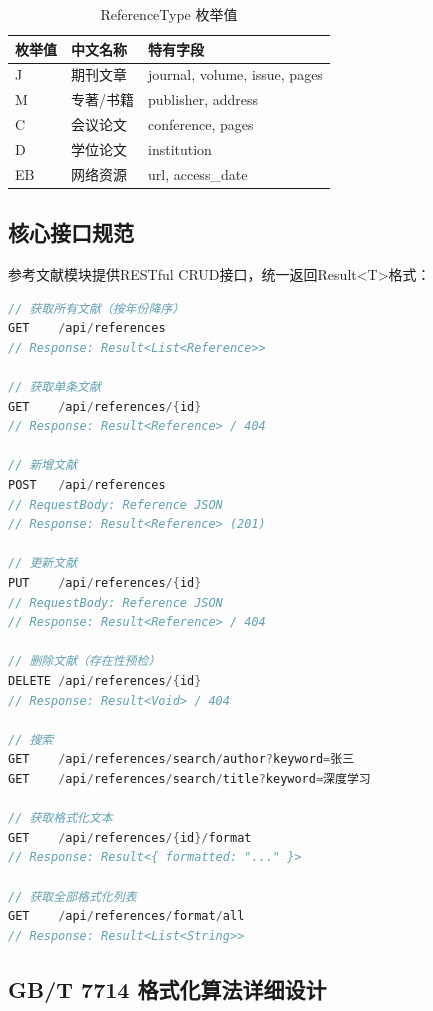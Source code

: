 \documentclass{../softeng}
\begin{document}
\begin{table}[htbp]
\centering
\caption{ReferenceType 枚举值}
\label{tab:reftype}
\begin{tabular}{llp{8cm}}
\toprule
\textbf{枚举值} & \textbf{中文名称} & \textbf{特有字段} \\
\midrule
J  & 期刊文章 & journal, volume, issue, pages \\
M  & 专著/书籍 & publisher, address \\
C  & 会议论文 & conference, pages \\
D  & 学位论文 & institution \\
EB & 网络资源 & url, access\_date \\
\bottomrule
\end{tabular}
\end{table}

\subsection{核心接口规范}

参考文献模块提供RESTful CRUD接口，统一返回Result<T>格式：

\begin{lstlisting}[language=Java,caption={ReferenceController 核心接口}]
// 获取所有文献（按年份降序）
GET    /api/references
// Response: Result<List<Reference>>

// 获取单条文献
GET    /api/references/{id}
// Response: Result<Reference> / 404

// 新增文献
POST   /api/references
// RequestBody: Reference JSON
// Response: Result<Reference> (201)

// 更新文献
PUT    /api/references/{id}
// RequestBody: Reference JSON
// Response: Result<Reference> / 404

// 删除文献（存在性预检）
DELETE /api/references/{id}
// Response: Result<Void> / 404

// 搜索
GET    /api/references/search/author?keyword=张三
GET    /api/references/search/title?keyword=深度学习

// 获取格式化文本
GET    /api/references/{id}/format
// Response: Result<{ formatted: "..." }>

// 获取全部格式化列表
GET    /api/references/format/all
// Response: Result<List<String>>
\end{lstlisting}

\subsection{GB/T 7714 格式化算法详细设计}
\end{document}
